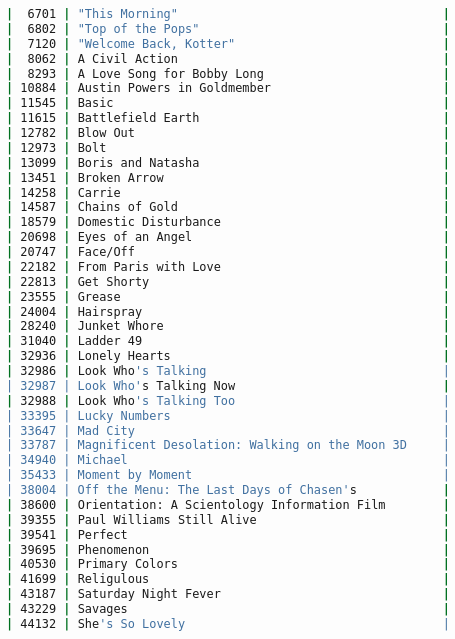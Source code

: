 \begin{lstlisting}[language=bash]
|  6701 | "This Morning"                                     |
|  6802 | "Top of the Pops"                                  |
|  7120 | "Welcome Back, Kotter"                             |
|  8062 | A Civil Action                                     |
|  8293 | A Love Song for Bobby Long                         |
| 10884 | Austin Powers in Goldmember                        |
| 11545 | Basic                                              |
| 11615 | Battlefield Earth                                  |
| 12782 | Blow Out                                           |
| 12973 | Bolt                                               |
| 13099 | Boris and Natasha                                  |
| 13451 | Broken Arrow                                       |
| 14258 | Carrie                                             |
| 14587 | Chains of Gold                                     |
| 18579 | Domestic Disturbance                               |
| 20698 | Eyes of an Angel                                   |
| 20747 | Face/Off                                           |
| 22182 | From Paris with Love                               |
| 22813 | Get Shorty                                         |
| 23555 | Grease                                             |
| 24004 | Hairspray                                          |
| 28240 | Junket Whore                                       |
| 31040 | Ladder 49                                          |
| 32936 | Lonely Hearts                                      |
| 32986 | Look Who's Talking                                 |
| 32987 | Look Who's Talking Now                             |
| 32988 | Look Who's Talking Too                             |
| 33395 | Lucky Numbers                                      |
| 33647 | Mad City                                           |
| 33787 | Magnificent Desolation: Walking on the Moon 3D     |
| 34940 | Michael                                            |
| 35433 | Moment by Moment                                   |
| 38004 | Off the Menu: The Last Days of Chasen's            |
| 38600 | Orientation: A Scientology Information Film        |
| 39355 | Paul Williams Still Alive                          |
| 39541 | Perfect                                            |
| 39695 | Phenomenon                                         |
| 40530 | Primary Colors                                     |
| 41699 | Religulous                                         |
| 43187 | Saturday Night Fever                               |
| 43229 | Savages                                            |
| 44132 | She's So Lovely                                    |

\end{lstlisting}
